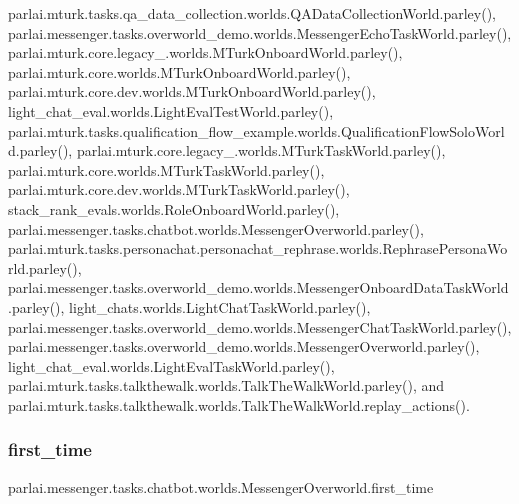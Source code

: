 parlai.\+mturk.\+tasks.\+qa\+\_\+data\+\_\+collection.\+worlds.\+Q\+A\+Data\+Collection\+World.\+parley(), parlai.\+messenger.\+tasks.\+overworld\+\_\+demo.\+worlds.\+Messenger\+Echo\+Task\+World.\+parley(), parlai.\+mturk.\+core.\+legacy\+\_.\+worlds.\+M\+Turk\+Onboard\+World.\+parley(), parlai.\+mturk.\+core.\+worlds.\+M\+Turk\+Onboard\+World.\+parley(), parlai.\+mturk.\+core.\+dev.\+worlds.\+M\+Turk\+Onboard\+World.\+parley(), light\+\_\+chat\+\_\+eval.\+worlds.\+Light\+Eval\+Test\+World.\+parley(), parlai.\+mturk.\+tasks.\+qualification\+\_\+flow\+\_\+example.\+worlds.\+Qualification\+Flow\+Solo\+World.\+parley(), parlai.\+mturk.\+core.\+legacy\+\_.\+worlds.\+M\+Turk\+Task\+World.\+parley(), parlai.\+mturk.\+core.\+worlds.\+M\+Turk\+Task\+World.\+parley(), parlai.\+mturk.\+core.\+dev.\+worlds.\+M\+Turk\+Task\+World.\+parley(), stack\+\_\+rank\+\_\+evals.\+worlds.\+Role\+Onboard\+World.\+parley(), parlai.\+messenger.\+tasks.\+chatbot.\+worlds.\+Messenger\+Overworld.\+parley(), parlai.\+mturk.\+tasks.\+personachat.\+personachat\+\_\+rephrase.\+worlds.\+Rephrase\+Persona\+World.\+parley(), parlai.\+messenger.\+tasks.\+overworld\+\_\+demo.\+worlds.\+Messenger\+Onboard\+Data\+Task\+World.\+parley(), light\+\_\+chats.\+worlds.\+Light\+Chat\+Task\+World.\+parley(), parlai.\+messenger.\+tasks.\+overworld\+\_\+demo.\+worlds.\+Messenger\+Chat\+Task\+World.\+parley(), parlai.\+messenger.\+tasks.\+overworld\+\_\+demo.\+worlds.\+Messenger\+Overworld.\+parley(), light\+\_\+chat\+\_\+eval.\+worlds.\+Light\+Eval\+Task\+World.\+parley(), parlai.\+mturk.\+tasks.\+talkthewalk.\+worlds.\+Talk\+The\+Walk\+World.\+parley(), and parlai.\+mturk.\+tasks.\+talkthewalk.\+worlds.\+Talk\+The\+Walk\+World.\+replay\+\_\+actions().

\mbox{\label{classparlai_1_1messenger_1_1tasks_1_1chatbot_1_1worlds_1_1MessengerOverworld_a4fc6debbb7611ff43bd85ca6bf8ff5f6}} 
\subsubsection{\texorpdfstring{first\+\_\+time}{first\_time}}
{\footnotesize\ttfamily parlai.\+messenger.\+tasks.\+chatbot.\+worlds.\+Messenger\+Overworld.\+first\+\_\+time}




